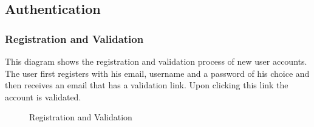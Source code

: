 \newpage
\subsection{Authentication}

\subsubsection{Registration and Validation}
This diagram shows the registration and validation process of new user accounts. The user first registers with his email, username and a password of his choice and then receives an email that has a validation link. Upon clicking this link the account is validated.
\begin{figure}[!htb]
    \centering
    \caption{Registration and Validation}
    \label{fig:seq-auth-register-and-validate}
\end{figure}

